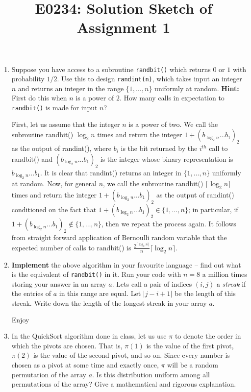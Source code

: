 \documentclass[11pt]{article}
\begin{document}
\title{E0234: Solution Sketch of Assignment 1}
\author{}
\maketitle
\begin{enumerate}
	\item Suppose you have access to a subroutine {\tt randbit()} which returns $0$ or $1$ with probability $1/2$. Use this to design {\tt randint(n)}, which takes input an integer $n$ and returns an integer 
	in the range $\{1,\ldots,n\}$ uniformly at random. {\bf Hint:} First do this when $n$ is a power of $2$. How many calls in expectation to {\tt randbit()} is made for input $n$? 
	
	\Sol First, let us assume that the integer $n$ is a power of two. We call the subroutine randbit() $\log_2 n$ times and return the integer $1+(b_{\log_2 n} \ldots b_1)_2$ as the output of randint(), where $b_i$ is the bit returned by the $i^{th}$ call to randbit() and $(b_{\log_2 n} \ldots b_1)_2$ is the integer whose binary representation is $b_{\log_2 n} \ldots b_1$. It is clear that randint() returns an integer in $\{1, \ldots, n\}$ uniformly at random. Now, for general $n$, we call the subroutine randbit() $\lceil \log_2 n\rceil$ times and return the integer $1+(b_{\log_2 n} \ldots b_1)_2$ as the output of randint() conditioned on the fact that $1+(b_{\log_2 n} \ldots b_1)_2 \in \{1, \ldots, n\}$; in particular, if $1+(b_{\log_2 n} \ldots b_1)_2 \notin \{1, \ldots, n\}$, then we repeat the process again. It follows from straight forward application of Bernoulli random variable that the expected number of calls to randbit() is $\frac{2^{\lceil \log_2 n \rceil}}{n} \lceil\log_2 n\rceil$.
	
	\item {\bf Implement} the above algorithm in your favourite language -- find out what is the equivalent of {\tt randbit()} in it. Run your code with $n=8$ a million times storing your answer in an array $a$.
	Lets call a pair of indices $(i,j)$ a {\em streak} if the entries of $a$ in this range are equal. Let $|j-i+1|$ be the length of this streak. Write down the length of the longest streak in your array $a$.
	
	\Sol Enjoy \smiley{}
	
	\item In the QuickSort algorithm done in class, let us use $\pi$ to denote the order in which the pivots are chosen. That is, $\pi(1)$ is the value of the first pivot, $\pi(2)$ is the value of the second pivot, and so on.
	Since every number is chosen as a pivot at some time and exactly once, $\pi$ will be a random permutation of the array $a$. Is this distribution uniform among all permutations of the array? 
	Give a mathematical and rigorous explanation.
	

\end{enumerate}
\end{document}
